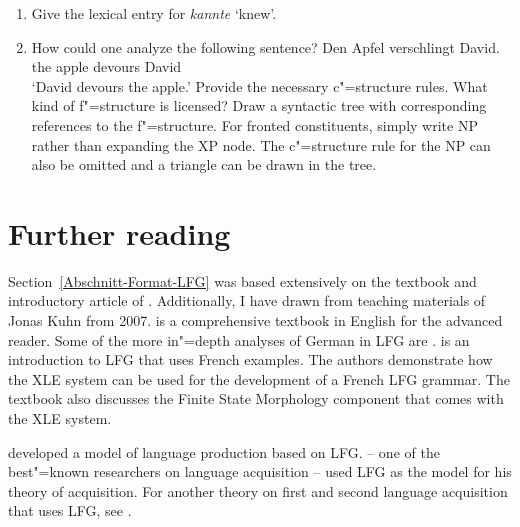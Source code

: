 \begin{enumerate}
\item Give the lexical entry for \emph{kannte} `knew'.
\item How could one analyze the following sentence?
\ea
\gll Den Apfel verschlingt David.\\
	 the apple devours David\\
\glt `David devours the apple.'
\z
Provide the necessary c"=structure rules. What kind of f"=structure is licensed?
Draw a syntactic tree with corresponding references to the f"=structure. For fronted constituents,
simply write NP rather than expanding the XP node.
The c"=structure rule for the NP can also be omitted and a triangle can be drawn in the tree.
\end{enumerate}


\section*{Further reading}


Section~\ref{Abschnitt-Format-LFG} was based extensively on the textbook and introductory article of \citet{Dalrymple2001a-u,Dalrymple2006a}. Additionally, I have drawn from
teaching materials of Jonas Kuhn from 2007.  is a comprehensive textbook in English for the advanced reader. Some of the more in"=depth analyses of
German in LFG are .   is an introduction to LFG that uses French examples. The authors demonstrate how the XLE system can be used for the development of a
French LFG grammar. The textbook also discusses the Finite State Morphology component that comes
with the XLE system.

\citet{Levelt89a} developed a model of language production based on LFG.
 \citet{Pinker84a-u} -- one of the best"=known researchers on language acquisition -- used LFG as the model for his theory of acquisition. For another theory on first and second
 language acquisition that uses LFG, see . 



